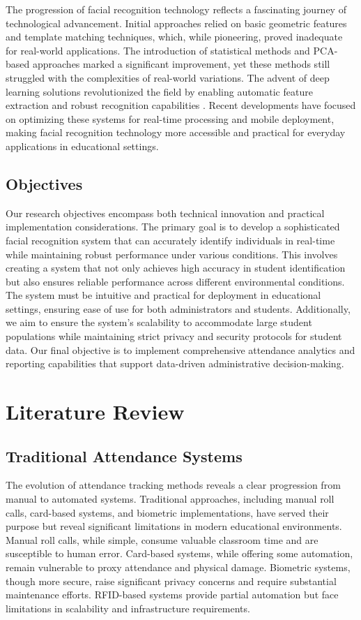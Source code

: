 \documentclass[conference]{IEEEtran}
\begin{document}
The progression of facial recognition technology reflects a fascinating journey of technological advancement. Initial approaches relied on basic geometric features and template matching techniques, which, while pioneering, proved inadequate for real-world applications. The introduction of statistical methods and PCA-based approaches marked a significant improvement, yet these methods still struggled with the complexities of real-world variations. The advent of deep learning solutions revolutionized the field by enabling automatic feature extraction and robust recognition capabilities \cite{b13}. Recent developments have focused on optimizing these systems for real-time processing and mobile deployment, making facial recognition technology more accessible and practical for everyday applications in educational settings.

\subsection{Objectives}
Our research objectives encompass both technical innovation and practical implementation considerations. The primary goal is to develop a sophisticated facial recognition system that can accurately identify individuals in real-time while maintaining robust performance under various conditions. This involves creating a system that not only achieves high accuracy in student identification but also ensures reliable performance across different environmental conditions. The system must be intuitive and practical for deployment in educational settings, ensuring ease of use for both administrators and students. Additionally, we aim to ensure the system's scalability to accommodate large student populations while maintaining strict privacy and security protocols for student data. Our final objective is to implement comprehensive attendance analytics and reporting capabilities that support data-driven administrative decision-making.

\section{Literature Review}

\subsection{Traditional Attendance Systems}
The evolution of attendance tracking methods reveals a clear progression from manual to automated systems. Traditional approaches, including manual roll calls, card-based systems, and biometric implementations, have served their purpose but reveal significant limitations in modern educational environments. Manual roll calls, while simple, consume valuable classroom time and are susceptible to human error. Card-based systems, while offering some automation, remain vulnerable to proxy attendance and physical damage. Biometric systems, though more secure, raise significant privacy concerns and require substantial maintenance efforts. RFID-based systems provide partial automation but face limitations in scalability and infrastructure requirements.
\end{document}
